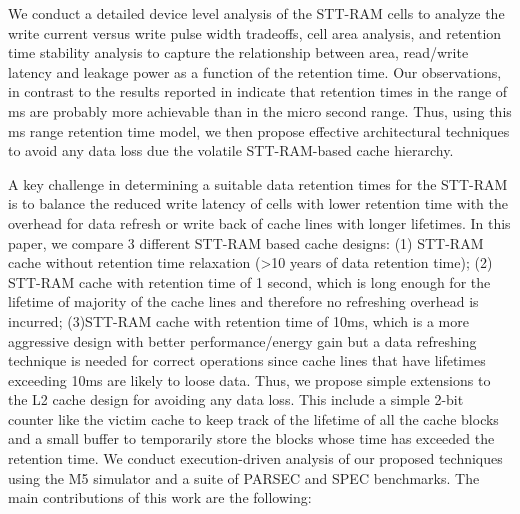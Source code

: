 We conduct a  detailed device level analysis of the STT-RAM cells to analyze the write current
versus write pulse width tradeoffs, cell area analysis, and retention time stability analysis
to capture the relationship between area, read/write latency and leakage power as a function of
the retention time. Our observations, in contrast to the results reported in \cite{} indicate
that retention times in the range of ms are probably more achievable than in the micro second range.
Thus, using this ms range retention time model, we then propose effective architectural techniques to
avoid any data loss due the volatile STT-RAM-based cache hierarchy.

A key challenge in determining a suitable data retention times for the STT-RAM is to balance the
reduced write latency of cells with lower retention time with the overhead for data refresh or write
back of cache lines with longer lifetimes. In this paper, we compare 3 different STT-RAM based cache
designs: (1) STT-RAM cache without retention time relaxation (>10 years of data retention time); (2)
STT-RAM cache with retention time of 1 second, which is long enough for the lifetime of majority of
the cache lines and therefore no refreshing overhead is incurred; (3)STT-RAM cache with retention
time of 10ms, which is a more aggressive design with better performance/energy gain but a data
refreshing technique is needed for correct operations since cache lines that have lifetimes exceeding
10ms are likely to loose data. Thus, we propose simple extensions to the L2 cache design for avoiding
any data loss. This include a simple 2-bit counter like the victim cache \cite{} to keep track of the
lifetime of all the cache blocks and a small buffer to temporarily store the blocks whose time has
exceeded the retention time.
We conduct execution-driven analysis of our proposed techniques using the M5 simulator and a suite of
PARSEC and SPEC benchmarks. The main contributions of this work are the following:

